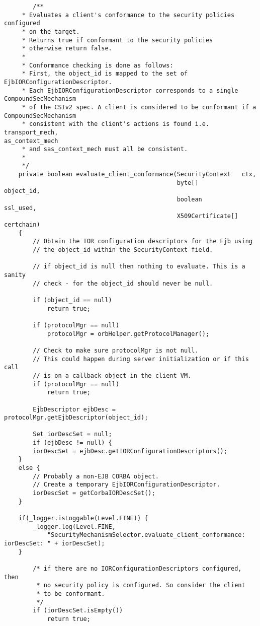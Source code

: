\begin{lstlisting}
	    /**
     * Evaluates a client's conformance to the security policies configured
     * on the target.
     * Returns true if conformant to the security policies
     * otherwise return false.
     *
     * Conformance checking is done as follows:
     * First, the object_id is mapped to the set of EjbIORConfigurationDescriptor.
     * Each EjbIORConfigurationDescriptor corresponds to a single CompoundSecMechanism
     * of the CSIv2 spec. A client is considered to be conformant if a
CompoundSecMechanism
     * consistent with the client's actions is found i.e. transport_mech,
as_context_mech
     * and sas_context_mech must all be consistent.
     * 
     */
    private boolean evaluate_client_conformance(SecurityContext   ctx,
                                                byte[]            object_id,
                                                boolean           ssl_used,
                                                X509Certificate[] certchain)
    {
        // Obtain the IOR configuration descriptors for the Ejb using
        // the object_id within the SecurityContext field.

        // if object_id is null then nothing to evaluate. This is a sanity
        // check - for the object_id should never be null.
        
        if (object_id == null)
            return true;

        if (protocolMgr == null)
            protocolMgr = orbHelper.getProtocolManager();

        // Check to make sure protocolMgr is not null. 
        // This could happen during server initialization or if this call
        // is on a callback object in the client VM. 
        if (protocolMgr == null)
            return true;

        EjbDescriptor ejbDesc = protocolMgr.getEjbDescriptor(object_id);

        Set iorDescSet = null;
        if (ejbDesc != null) {
	    iorDescSet = ejbDesc.getIORConfigurationDescriptors();
	}
	else {
	    // Probably a non-EJB CORBA object.
	    // Create a temporary EjbIORConfigurationDescriptor.
	    iorDescSet = getCorbaIORDescSet();
	}

	if(_logger.isLoggable(Level.FINE)) {
	    _logger.log(Level.FINE,
			"SecurityMechanismSelector.evaluate_client_conformance: iorDescSet: " + iorDescSet);
	}

        /* if there are no IORConfigurationDescriptors configured, then
         * no security policy is configured. So consider the client 
         * to be conformant.
         */
        if (iorDescSet.isEmpty())
            return true;


\end{lstlisting}
